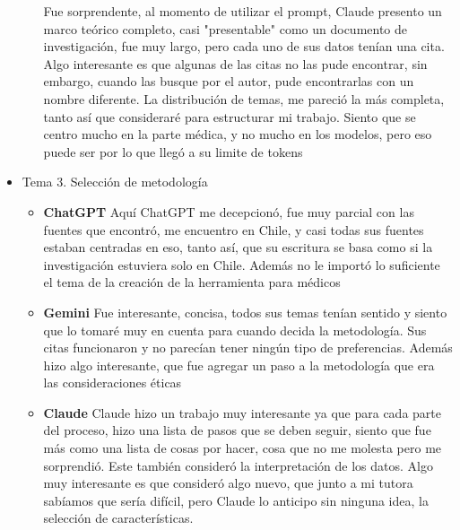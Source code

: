 \documentclass{article}
\begin{document}
\begin{itemize}
\begin{itemize}
            Fue sorprendente, al momento de utilizar el
            prompt, Claude presento un marco teórico
            completo, casi "presentable" como un documento
            de investigación, fue muy largo, pero
            cada uno de sus datos tenían una cita. Algo
            interesante es que algunas de las citas no las
            pude encontrar, sin embargo, cuando las busque
            por el autor, pude encontrarlas con un nombre
            diferente. La distribución de temas, me pareció
            la más completa, tanto así que consideraré para
            estructurar mi trabajo. Siento que se centro
            mucho en la parte médica, y no mucho en los
            modelos, pero eso puede ser por lo que llegó a
            su limite de tokens
        \end{itemize}
    \item Tema 3. Selección de metodología
        \begin{itemize}
        \item \textbf{ChatGPT}
            Aquí ChatGPT me decepcionó, fue muy parcial
            con las fuentes que encontró, me encuentro en
            Chile, y casi todas sus fuentes estaban
            centradas en eso, tanto así, que su escritura se
            basa como si la investigación estuviera solo en
            Chile. Además no le importó lo suficiente el
            tema de la creación de la herramienta para
            médicos
        \item \textbf{Gemini}
            Fue interesante, concisa, todos sus temas tenían
            sentido y siento que lo tomaré muy en cuenta
            para cuando decida la metodología. Sus citas
            funcionaron y no parecían tener ningún tipo de
            preferencias. Además hizo algo interesante, que
            fue agregar un paso a la metodología que era las
            consideraciones éticas
        \item \textbf{Claude}
            Claude hizo un trabajo muy interesante ya que
            para cada parte del proceso, hizo una lista de
            pasos que se deben seguir, siento que fue más
            como una lista de cosas por hacer, cosa que no
            me molesta pero me sorprendió. Este también
            consideró la interpretación de los datos. Algo
            muy interesante es que consideró algo nuevo, que
            junto a mi tutora sabíamos que sería difícil,
            pero Claude lo anticipo sin ninguna idea,
            la selección de características.
        \end{itemize}
\end{itemize}
\end{document}
